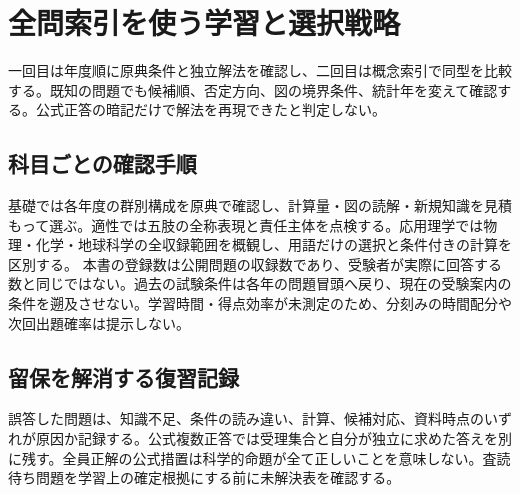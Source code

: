 \chapter{全問索引を使う学習と選択戦略}
一回目は年度順に原典条件と独立解法を確認し、二回目は概念索引で同型を比較する。既知の問題でも候補順、否定方向、図の境界条件、統計年を変えて確認する。公式正答の暗記だけで解法を再現できたと判定しない。
\section{科目ごとの確認手順}
基礎では各年度の群別構成を原典で確認し、計算量・図の読解・新規知識を見積もって選ぶ。適性では五肢の全称表現と責任主体を点検する。応用理学では物理・化学・地球科学の全収録範囲を概観し、用語だけの選択と条件付きの計算を区別する。
本書の登録数は公開問題の収録数であり、受験者が実際に回答する数と同じではない。過去の試験条件は各年の問題冒頭へ戻り、現在の受験案内の条件を遡及させない。学習時間・得点効率が未測定のため、分刻みの時間配分や次回出題確率は提示しない。
\section{留保を解消する復習記録}
誤答した問題は、知識不足、条件の読み違い、計算、候補対応、資料時点のいずれが原因か記録する。公式複数正答では受理集合と自分が独立に求めた答えを別に残す。全員正解の公式措置は科学的命題が全て正しいことを意味しない。査読待ち問題を学習上の確定根拠にする前に未解決表を確認する。
